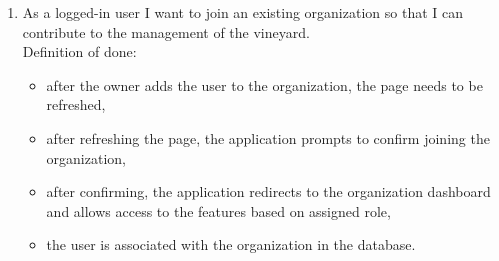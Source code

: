 \begin{enumerate}
	\begin{itemize}
		\item validation prevents creation if user already has an organization,
		\item after clicking the "create organization" option, the application asks to provide the organization details and confirm the action,
		\item after successfully creating the organization, the application displays a confirmation pop-up and redirects to the organization management page,
		\item the user is assigned the role of "owner" in the newly created organization,
		\item the organization is added to the database and associated with the user's account.
	\end{itemize}
	\item As a logged-in user I want to join an existing organization so that I can contribute to the management of the vineyard.
	\\Definition of done:
	\begin{itemize}
		\item after the owner adds the user to the organization, the page needs to be refreshed,
		\item after refreshing the page, the application prompts to confirm joining the organization,
		\item after confirming, the application redirects to the organization dashboard and allows access to the features based on assigned role,
		\item the user is associated with the organization in the database.
	\end{itemize}
\end{enumerate}


